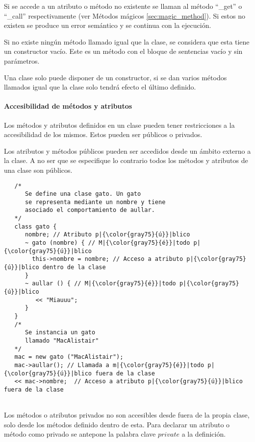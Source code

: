Si se accede a un atributo o método no existente se llaman al método ``\_get'' o ``\_call'' respectivamente (ver Métodos mágicos \autoref{sec:magic_method}). Si 
estos no existen se produce un error semántico y se continua con la ejecución.

Si no existe ningún método llamado igual que la clase, se considera que esta tiene un constructor vacío. Este es
un método con el bloque de sentencias vacío y sin parámetros.

Una clase solo puede disponer de un constructor, si se dan varios métodos llamados igual que la clase solo tendrá 
efecto el último definido.

\paragraph{Accesibilidad de métodos y atributos}
Los métodos y atributos definidos en un clase pueden tener restricciones a la accesibilidad de los mismos. Estos pueden ser públicos 
o privados.

Los atributos y métodos públicos pueden ser accedidos desde un ámbito externo a la clase. A no ser que se especifique lo contrario todos los
métodos y atributos de una clase son públicos. \\

\begin{lstlisting}
   /*
      Se define una clase gato. Un gato 
      se representa mediante un nombre y tiene
      asociado el comportamiento de aullar.
   */
   class gato {
      nombre; // Atributo p|{\color{gray75}{ú}}|blico
      ~ gato (nombre) { // M|{\color{gray75}{é}}|todo p|{\color{gray75}{ú}}|blico
        this->nombre = nombre; // Acceso a atributo p|{\color{gray75}{ú}}|blico dentro de la clase
      }
      ~ aullar () { // M|{\color{gray75}{é}}|todo p|{\color{gray75}{ú}}|blico
         << "Miauuu";
      }
   }
   /*
      Se instancia un gato 
      llamado "MacAlistair"
   */
   mac = new gato ("MacAlistair"); 
   mac->aullar(); // Llamada a m|{\color{gray75}{é}}|todo p|{\color{gray75}{ú}}|blico fuera de la clase
   << mac->nombre;  // Acceso a atributo p|{\color{gray75}{ú}}|blico fuera de la clase
\end{lstlisting}
\hfill\\ 

Los métodos o atributos privados no son accesibles desde fuera de la propia clase, solo desde los métodos definido dentro de esta. Para 
declarar un atributo o método como privado se antepone la palabra clave $private$ a la definición. \\

